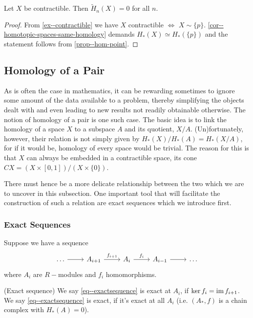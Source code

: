 \documentclass[a4paper,11pt]{article}
\begin{document}
			\begin{cor}
				Let $X$ be contractible. Then $\tilde{H}_n(X)=0$ for all $n$.
			\end{cor}
			\begin{proof}
				From \autoref{ex--contractible} we have $X$ contractible $\Longleftrightarrow$ $X\sim\{p\}$. \autoref{cor--homotopic-spaces-same-homology} demands $H_\ast(X)\simeq H_\ast(\{p\})$ and the statement follows from \autoref{prop--hom-point}.
			\end{proof}

		
		\subsection{Homology of a Pair}

			As is often the case in mathematics, it can be rewarding sometimes to ignore some amount of the data available to a problem, thereby simplifying the objects dealt with and even leading to new results not readily obtainable otherwise. The notion of homology of a pair is one such case. The basic idea is to link the homology of a space $X$ to a subspace $A$ and its quotient, $X/ A$. (Un)fortunately, however, their relation is not simply given by $H_\ast(X)/ H_\ast(A)=H_\ast(X/ A)$, for if it would be, homology of every space would be trivial. The reason for this is that $X$ can always be embedded in a contractible space, its cone $CX=(X\times [0,1])/(X\times\{0\})$. 
			
			There must hence be a more delicate relationship between the two which we are to uncover in this subsection. One important tool that will facilitate the construction of such a relation are exact sequences which we introduce first.  

			\subsubsection*{Exact Sequences}

				Suppose we have a sequence
				\begin{equation}\label{eq--exactsequence}
					\begin{tikzcd}
						\dots\ar[r]& A_{i+1}\ar[r,"f_{i+1}"]& A_i\ar[r,"f_i"]& A_{i-1}\ar[r]& \dots 
					\end{tikzcd}
				\end{equation}
				where $A_i$ are $R-$modules and $f_i$ homomorphisms.

				\begin{defi}
					(Exact sequence) We say \eqref{eq--exactsequence} is exact at $A_i$, if $\ker f_i=\operatorname{im} f_{i+1}$. We say \eqref{eq--exactsequence} is exact, if it's exact at all $A_i$ (i.e. $(A_\ast,f)$ is a chain complex with $H_\ast(A)=0$).
				\end{defi}
\end{document}
